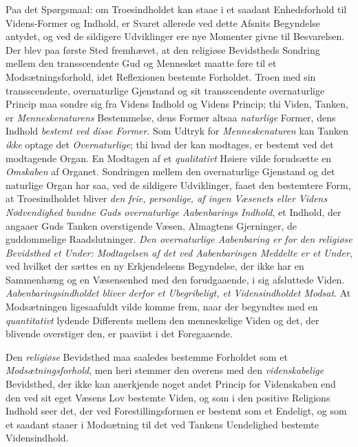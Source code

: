 \documentclass[12pt,a4paper]{book}
\newcommand{\opage}[1]{\marginnote{\footnotesize\textit{[#1]}}}
\begin{document}
Paa det Spørgsmaal: om Troesindholdet kan staae i et saadant Enhedsforhold til
Videns-Former og Indhold, er Svaret allerede ved dette Afsnits Begyndelse antydet, og \opage{113}ved
de sildigere Udviklinger ere nye Momenter givne til Besvarelsen. Der blev paa første Sted
fremhævet, at den religiøse Bevidstheds Sondring mellem den transscendente Gud og
Mennesket maatte føre til et Modsætningsforhold, idet Reflexionen bestemte Forholdet. Troen
med sin transscendente, overnaturlige Gjenstand og sit transscendente overnaturlige Princip
maa sondre sig fra Videns Indhold og Videns Princip; thi Viden, Tanken, er \emph{Menneskenaturens} Bestemmelse, dens Former altsaa \emph{naturlige} Former, dens Indhold \emph{bestemt ved disse Former}. Som Udtryk for \emph{Menneskenaturen} kan Tanken \emph{ikke} optage det \emph{Overnaturlige}; thi
hvad der kan modtages, er bestemt ved det modtagende Organ. En Modtagen af et \emph{qualitativt} Høiere vilde forudsætte en \emph{Omskaben} af Organet. Sondringen mellem den
overnaturlige Gjenstand og det naturlige Organ har saa, ved de sildigere Udviklinger, faaet
den bestemtere Form, at Troesindholdet bliver \emph{den frie, personlige, af ingen Væsenets
eller Videns Nødvendighed bundne Guds overnaturlige Aabenbarings Indhold}, et Indhold, der
angaaer Guds Tanken overstigende Væsen, Almagtens Gjerninger, de guddommelige
Raadslutninger. \emph{Den overnaturlige Aabenbaring er for den religiøse Bevidsthed et
Under: Modtagelsen af det ved Aabenbaringen Meddelte er et Under}, ved hvilket der sættes en
ny Erkjendelsens Begyndelse, der ikke har en Sammenhæng og en Væsensenhed med den
forudgaaende, i sig afsluttede Viden. \emph{Aabenbaringsindholdet bliver derfor et
Ubegribeligt, et Vidensindholdet Modsat}. At Modsætningen ligesaafuldt vilde komme frem,
naar der begyndtes med en \emph{quantitativt} lydende Differents mellem den menneskelige Viden og
det, der blivende overstiger den, er paaviist i det Foregaaende.

Den \emph{religiøse} Bevidsthed maa saaledes bestemme Forholdet som et \emph{Modsætningsforhold}, men
heri stemmer den overens med den \emph{videnskabelige} Bevidsthed, der ikke kan anerkjende noget
andet Princip for Videnskaben end den ved sit \opage{114}eget Væsens Lov bestemte Viden, og som i den
positive Religions Indhold seer det, der ved Forestillingsformen er bestemt som et
Endeligt, og som et saadant staaer i Modsætning til det ved Tankens Uendelighed bestemte
Vidensindhold.
\end{document}
